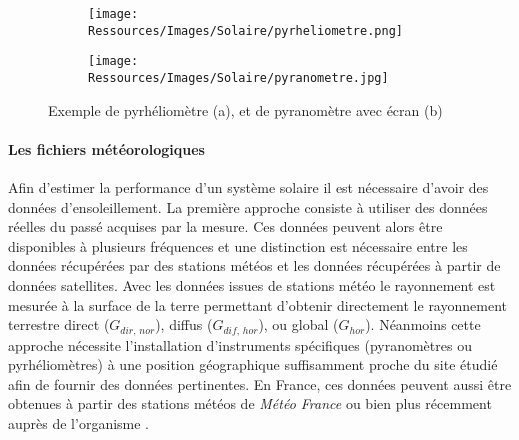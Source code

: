 \begin{figure}
    \centering
    \begin{subfigure}[b]{0.45\textwidth}
        \texttt{[image: Ressources/Images/Solaire/pyrheliometre.png]}
        \caption{}
        \label{fig:schema_pyrheliometre}
    \end{subfigure}
    \quad
    \begin{subfigure}[b]{0.45\textwidth}
        \texttt{[image: Ressources/Images/Solaire/pyranometre.jpg]}
        \caption{}
        \label{fig:schema_pyranometre}
    \end{subfigure}
    \caption[Exemple de pyrhéliomètre et de pyranomètre avec écran]
             {Exemple de pyrhéliomètre (a), et de pyranomètre avec écran (b)}
    \label{fig:image_mesure_rayonnement}
\end{figure}

\paragraph{Les fichiers météorologiques} %
\label{par:les_fichiers_meteorologiques}
Afin d’estimer la performance d’un système solaire il est nécessaire d’avoir des données
d’ensoleillement. La première approche consiste à utiliser des données réelles du passé
acquises par la mesure. Ces données peuvent alors être disponibles à plusieurs fréquences
et une distinction est nécessaire entre les données récupérées par des stations météos et
les données récupérées à partir de données satellites. Avec les données issues de stations
météo le rayonnement est mesurée à la surface de la terre permettant d’obtenir directement
le rayonnement terrestre direct ($G_{dir,\,nor}$), diffus ($G_{dif,\,hor}$), ou global
($G_{hor}$). Néanmoins cette approche nécessite l’installation d’instruments spécifiques
(pyranomètres ou pyrhéliomètres) à une position géographique suffisamment proche du
site étudié afin de fournir des données pertinentes. En France, ces données peuvent aussi
être obtenues à partir des stations météos de \textit{Météo France} ou bien plus récemment auprès
de l’organisme .

